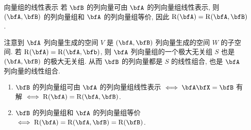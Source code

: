 \begin{frame}{向量组的线性表示}
	\onslide<+->
	若 $\bfB$ 的列向量可由 $\bfA$ 的列向量组线性表示, 则 $(\bfA,\bfB)$ 的列向量组和 $\bfA$ 的列向量组等价,
	\onslide<+->
	因此 $\rank(\bfA)=\rank(\bfA,\bfB)$.

	\onslide<+->
	注意到 $\bfA$ 列向量生成的空间 $V$ 是 $(\bfA,\bfB)$ 列向量生成的空间 $W$ 的子空间.
	\onslide<+->
	若 $\rank(\bfA)=\rank(\bfA,\bfb)$, 则 $\bfA$ 列向量组的一个极大无关组 $S$ 也是 $(\bfA,\bfB)$ 的极大无关组.
	\onslide<+->
	从而 $\bfB$ 的列向量都是 $S$ 的线性组合, 也是 $\bfA$ 列向量的线性组合.

	\onslide<+->
	\begin{theorem}
		\begin{enumerate}
			\item $\bfB$ 的列向量组可由 $\bfA$ 的列向量组线性表示 $\iff \bfA\bfX=\bfB$ 有解 $\iff \rank(\bfA)=\rank(\bfA,\bfB)$.
			\item $\bfB$ 的列向量组和 $\bfA$ 的列向量组等价 $\iff \rank(\bfA)=\rank(\bfA,\bfB)=\rank(\bfB)$.
		\end{enumerate}
	\end{theorem}
\end{frame}


